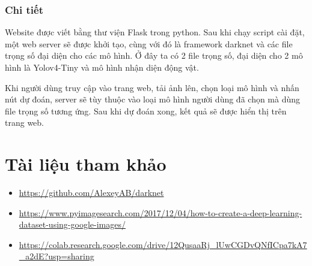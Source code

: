 \documentclass[20pt, a4paper]{article}
\begin{document}
\subsubsection{Chi tiết}
Website được viết bằng thư viện Flask trong python. Sau khi chạy script cài đặt, một web server sẽ được khởi tạo, cùng với đó là framework darknet và các file trọng số đại diện cho các mô hình. 
Ở đây ta có 2 file trọng số, đại diện cho 2 mô hình là Yolov4-Tiny và mô hình nhận diện động vật.

Khi người dùng truy cập vào trang web, tải ảnh lên, chọn loại mô hình và nhấn nút dự đoán, 
server sẽ tùy thuộc vào loại mô hình người dùng đã chọn mà dùng file trọng số tương ứng. Sau khi dự đoán xong, kết quả sẽ được hiển thị trên trang web. 
\section{Tài liệu tham khảo}
\begin{itemize}
	\item \url{https://github.com/AlexeyAB/darknet}
	\item \url{https://www.pyimagesearch.com/2017/12/04/how-to-create-a-deep-learning-dataset-using-google-images/}
	\item \url{https://colab.research.google.com/drive/12QusaaRj_lUwCGDvQNfICpa7kA7_a2dE?usp=sharing}
\end{itemize}
\end{document}
